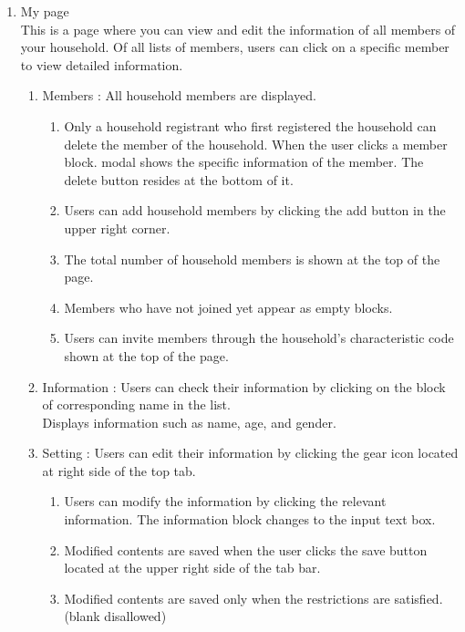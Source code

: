 \documentclass[11pt, conference]{IEEEtran}
\begin{document}
\begin{enumerate}[label=\arabic*]
    \item {\large{My page}}\\
    This is a page where you can view and edit the information of all members of your household. Of all lists of members, users can click on a specific member to view detailed information.
    \begin{enumerate}[label=\alph*]
        \item Members  : All household members are displayed.
        \begin{enumerate}
            \item Only a household registrant who first registered the household can delete the member of the household. When the user clicks a member block. modal shows the specific information of the member. The delete button resides at the bottom of it. 
            \item Users can add household members by clicking the add button in the upper right corner.
            \item The total number of household members is shown at the top of the page.
            \item Members who have not joined yet appear as empty blocks.
            \item Users can invite members through the household's characteristic code shown at the top of the page.
        \end{enumerate}
        \item Information : Users can check their information by clicking on the block of corresponding name in the list.\\
        Displays information such as name, age, and gender.
        \item Setting : Users can edit their information by clicking the gear icon located at right side of the top tab.
        \begin{enumerate}
            \item Users can modify the information by clicking the relevant information. The information block changes to the input text box.
            \item Modified contents are saved when the user clicks the save button located at the upper right side of the tab bar. 
            \item Modified contents are saved only when the restrictions are satisfied. (blank disallowed)\\
        \end{enumerate}
    \end{enumerate}
\end{enumerate}
\end{document}

